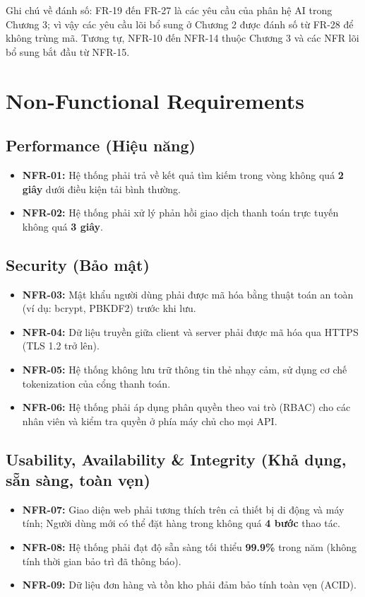 \documentclass[12pt,a4paper,oneside]{report}
\begin{document}
Ghi chú về đánh số: FR-19 đến FR-27 là các yêu cầu của phân hệ AI trong Chương 3; vì vậy các yêu cầu lõi bổ sung ở Chương 2 được đánh số từ FR-28 để không trùng mã. Tương tự, NFR-10 đến NFR-14 thuộc Chương 3 và các NFR lõi bổ sung bắt đầu từ NFR-15.

\section{Non-Functional Requirements}

\subsection{Performance (Hiệu năng)}

\begin{itemize}
  \item \textbf{NFR-01:} Hệ thống phải trả về kết quả tìm kiếm trong vòng không quá \textbf{2 giây} dưới điều kiện tải bình thường.
  \item \textbf{NFR-02:} Hệ thống phải xử lý phản hồi giao dịch thanh toán trực tuyến không quá \textbf{3 giây}.
\end{itemize}

\subsection{Security (Bảo mật)}

\begin{itemize}
  \item \textbf{NFR-03:} Mật khẩu người dùng phải được mã hóa bằng thuật toán an toàn (ví dụ: bcrypt, PBKDF2) trước khi lưu.
  \item \textbf{NFR-04:} Dữ liệu truyền giữa client và server phải được mã hóa qua HTTPS (TLS 1.2 trở lên).
  \item \textbf{NFR-05:} Hệ thống không lưu trữ thông tin thẻ nhạy cảm, sử dụng cơ chế tokenization của cổng thanh toán.
  \item \textbf{NFR-06:} Hệ thống phải áp dụng phân quyền theo vai trò (RBAC) cho các nhân viên và kiểm tra quyền ở phía máy chủ cho mọi API.
\end{itemize}

\subsection{Usability, Availability \& Integrity (Khả dụng, sẵn sàng, toàn vẹn)}

\begin{itemize}
  \item \textbf{NFR-07:} Giao diện web phải tương thích trên cả thiết bị di động và máy tính; Người dùng mới có thể đặt hàng trong không quá \textbf{4 bước} thao tác.
  \item \textbf{NFR-08:} Hệ thống phải đạt độ sẵn sàng tối thiểu \textbf{99.9\%} trong năm (không tính thời gian bảo trì đã thông báo).
  \item \textbf{NFR-09:} Dữ liệu đơn hàng và tồn kho phải đảm bảo tính toàn vẹn (ACID).
\end{itemize}
\end{document}
